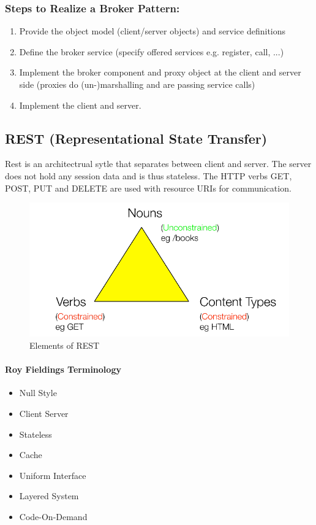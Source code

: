 \subsubsection*{Steps to Realize a Broker Pattern:}
\begin{enumerate}
  \item Provide the object model (client/server objects) and service definitions
  \item Define the broker service (specify offered services e.g. register, call, ...)
  \item Implement the broker component and proxy object at the client and server side (proxies do \hbox{(un-)marshalling} and are passing service calls)
  \item Implement the client and server.
\end{enumerate}
\newpage

\subsection{REST (Representational State Transfer)}
Rest is an architectrual sytle that separates between client and server.
The server does not hold any session data and is thus stateless.
The HTTP verbs GET, POST, PUT and DELETE are used with resource URIs for communication.
\begin{figure}[H]
  \centering
  \includegraphics[width=.85\linewidth]{images/patttern_rest.png}
  \caption{Elements of REST}
\end{figure}
\paragraph{Roy Fieldings Terminology}
\begin{itemize}
  \item Null Style
  \item Client Server
  \item Stateless
  \item Cache
  \item Uniform Interface
  \item Layered System
  \item Code-On-Demand
\end{itemize}
\newpage
